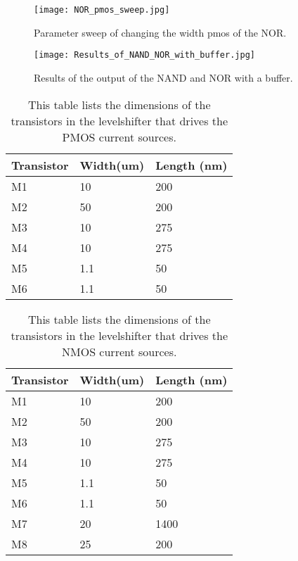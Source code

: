 \begin{appendices}
\begin{figure}[h]
 \texttt{[image: NOR\_pmos\_sweep.jpg]}
 \caption{Parameter sweep of changing the width pmos of the NOR.}
 \label{fig:NOR_pmos_sweep_figure}
\end{figure}

\begin{figure}[h]
 \texttt{[image: Results\_of\_NAND\_NOR\_with\_buffer.jpg]}
 \caption{Results of the output of the NAND and NOR with a buffer.}
 \label{fig:Results_of_NAND_NOR_with_buffer_figure}
\end{figure}

\begin{table}[h!]
\caption{This table lists the dimensions of the transistors in the levelshifter that drives the PMOS current sources.}
\begin{tabular}{l||l|l}\arraybackslash
Transistor & Width(um) & Length (nm) \\\hline\hline
M1 & 10 & 200\\\hline
M2 & 50 & 200\\\hline
M3 & 10 & 275\\\hline
M4 & 10 & 275\\\hline
M5 & 1.1 & 50\\\hline
M6 & 1.1 & 50
\end{tabular}
\label{Tab:Levelshifter_PMOS_sizes}
\end{table}

\begin{table}[h!]
\caption{This table lists the dimensions of the transistors in the levelshifter that drives the NMOS current sources.}
\begin{tabular}{l||l|l}\arraybackslash
Transistor & Width(um) & Length (nm) \\\hline\hline
M1 & 10 & 200\\\hline
M2 & 50 & 200\\\hline
M3 & 10 & 275\\\hline
M4 & 10 & 275\\\hline
M5 & 1.1 & 50\\\hline
M6 & 1.1 & 50\\\hline
M7 & 20 & 1400\\\hline
M8 & 25 & 200
\end{tabular}
\label{Tab:Levelshifter_NMOS_sizes}
\end{table}


\end{appendices}
